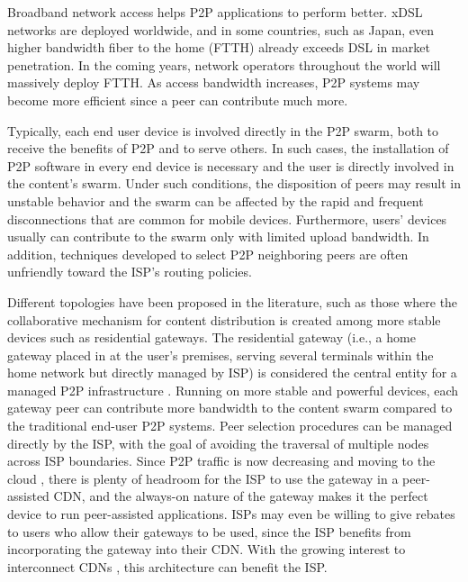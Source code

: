 \documentclass[conference]{IEEEtran}
\begin{document}
Broadband network access helps P2P applications to perform better. xDSL networks are deployed worldwide, and in some countries, such as Japan, even higher bandwidth fiber to the home (FTTH) already exceeds DSL in market penetration. 
In the coming years, network operators throughout the world will massively deploy FTTH. 
As access bandwidth increases, P2P systems may become more efficient since a peer can contribute much more.

Typically, each end user device is involved directly in the P2P swarm, both to receive the benefits of P2P and to serve others.  
In such cases, the installation of P2P software in every end device is necessary and the user is directly involved in the content's swarm.
Under such conditions, the disposition of peers may result in unstable behavior and the swarm can be affected by the rapid and frequent disconnections that are common for mobile devices.  
Furthermore, users' devices usually can contribute to the swarm only with limited upload bandwidth.  
In addition, techniques developed to select P2P neighboring peers are often unfriendly toward the ISP's routing policies.

Different topologies have been proposed in the literature, such as those where the collaborative mechanism for content distribution is
created among more stable devices such as residential gateways.  
The residential gateway (i.e., a home gateway placed in at the user's premises, serving several terminals within the home network but directly managed by ISP) is considered the central entity for a managed P2P infrastructure \cite{Misra:2010:IPS:1811099.1811064,Cha:2008:NTP:1855641.1855646}.
Running on more stable and powerful devices, each gateway peer can contribute more bandwidth to the content swarm compared to the traditional end-user P2P systems.  Peer selection procedures can be managed directly by the ISP, with the goal of avoiding the traversal of multiple nodes across ISP boundaries.  
Since P2P traffic is now decreasing and moving to the cloud \cite{Labovitz:2010:IIT:2043164.1851194}, there is plenty of headroom for the ISP to use the gateway in a peer-assisted CDN, and the always-on nature of the gateway makes it the perfect device to run peer-assisted applications.  
ISPs may even be willing to give rebates to users who allow their gateways to be used, since the ISP benefits from incorporating the gateway into their CDN.  With the growing interest to interconnect CDNs \cite{cdni,oceanproject}, this architecture can benefit the ISP.
\end{document}
